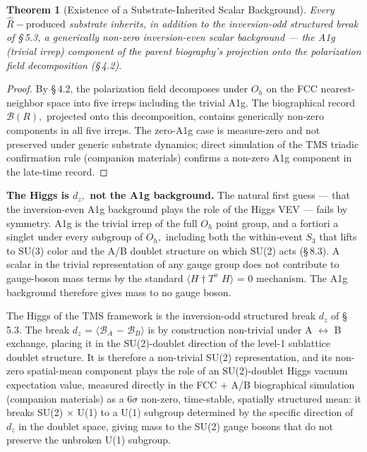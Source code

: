 \documentclass[11pt,oneside]{report}
\newtheorem{theorem}{Theorem}[section]
\theoremstyle{definition}
\theoremstyle{remark}
\begin{document}
\begin{theorem}[Existence of a Substrate-Inherited Scalar Background]
Every \ensuremath{\hat{R}-\text{produced}} substrate inherits, in addition to the
inversion-odd structured break of \S\,5.3, a generically non-zero
inversion-even scalar background --- the A1g (trivial irrep) component
of the parent biography's projection onto the polarization field
decomposition (\S\,4.2).
\end{theorem}

\begin{proof}
By \S\,4.2, the polarization field decomposes under \ensuremath{O_{h}} on
the FCC nearest-neighbor space into five irreps including the trivial
A1g. The biographical record \ensuremath{\mathcal{B}(R),} projected onto this decomposition,
contains generically non-zero components in all five irreps. The
zero-A1g case is measure-zero and not preserved under generic substrate
dynamics; direct simulation of the TMS triadic confirmation rule
(companion materials) confirms a non-zero A1g component in the late-time
record.

\end{proof}

\textbf{The Higgs is \ensuremath{d_{z},} not the A1g background.} The natural first
guess --- that the inversion-even A1g background plays the role of the
Higgs VEV --- fails by symmetry. A1g is the trivial irrep of the full
\ensuremath{O_{h}} point group, and a fortiori a singlet under every subgroup of \ensuremath{O_{h},}
including both the within-event \ensuremath{S_{3}} that lifts to SU(3) color and the A/B
doublet structure on which SU(2) acts (\S\,8.3). A scalar in the trivial
representation of any gauge group does not contribute to gauge-boson
mass terms by the standard \ensuremath{\langle H\dagger T^{a}} \ensuremath{H\rangle} = 0 mechanism. The A1g
background therefore gives mass to no gauge boson.

The Higgs of the TMS framework is the inversion-odd structured break
\ensuremath{d_{z}} of \S\,5.3. The break \ensuremath{d_{z}} = \ensuremath{\langle \mathcal{B}_{A}} \ensuremath{-} \ensuremath{\mathcal{B}_{B}\rangle} is by construction
non-trivial under A \ensuremath{\leftrightarrow} B exchange, placing it in the SU(2)-doublet
direction of the level-1 sublattice doublet structure. It is therefore a
non-trivial SU(2) representation, and its non-zero spatial-mean
component plays the role of an SU(2)-doublet Higgs vacuum expectation
value, measured directly in the FCC + A/B biographical simulation
(companion materials) as a \ensuremath{6\sigma} non-zero, time-stable, spatially
structured mean: it breaks SU(2) \ensuremath{\times} U(1) to a U(1) subgroup determined by
the specific direction of \ensuremath{d_{z}} in the doublet space, giving mass to the
SU(2) gauge bosons that do not preserve the unbroken U(1) subgroup.
\end{document}
